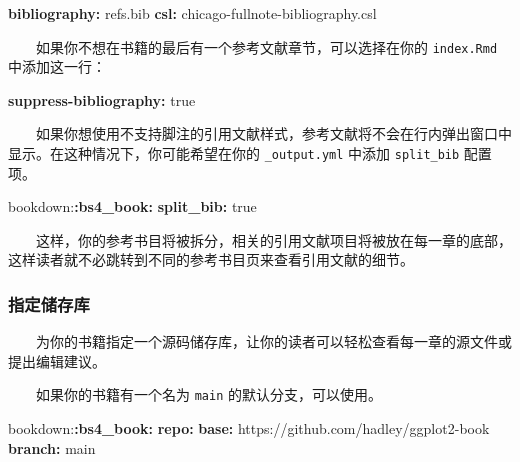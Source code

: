 \documentclass[
  12pt,
]{krantz}
\newenvironment{Shaded}{\begin{snugshade}}{\end{snugshade}}
\newcommand{\AttributeTok}[1]{\textcolor[rgb]{0.13,0.29,0.53}{#1}}
\newcommand{\CharTok}[1]{\textcolor[rgb]{0.31,0.60,0.02}{#1}}
\newcommand{\FunctionTok}[1]{\textcolor[rgb]{0.13,0.29,0.53}{\textbf{#1}}}
\newcommand{\KeywordTok}[1]{\textcolor[rgb]{0.13,0.29,0.53}{\textbf{#1}}}
\theoremstyle{definition}
\theoremstyle{definition}
\theoremstyle{definition}
\theoremstyle{definition}
\theoremstyle{remark}
\begin{document}
\begin{Shaded}
\begin{Highlighting}[]
\FunctionTok{bibliography}\KeywordTok{:}\AttributeTok{ refs.bib}
\FunctionTok{csl}\KeywordTok{:}\AttributeTok{ chicago{-}fullnote{-}bibliography.csl}
\end{Highlighting}
\end{Shaded}

  如果你不想在书籍的最后有一个参考文献章节，可以选择在你的 \texttt{index.Rmd} 中添加这一行：

\begin{Shaded}
\begin{Highlighting}[]
\FunctionTok{suppress{-}bibliography}\KeywordTok{:}\AttributeTok{ }\CharTok{true}
\end{Highlighting}
\end{Shaded}

  如果你想使用不支持脚注的引用文献样式，参考文献将不会在行内弹出窗口中显示。在这种情况下，你可能希望在你的 \texttt{\_output.yml} 中添加 \texttt{split\_bib} 配置项。

\begin{Shaded}
\begin{Highlighting}[]
\AttributeTok{bookdown:}\FunctionTok{:bs4\_book}\KeywordTok{:}
\AttributeTok{  }\FunctionTok{split\_bib}\KeywordTok{:}\AttributeTok{ }\CharTok{true}
\end{Highlighting}
\end{Shaded}

  这样，你的参考书目将被拆分，相关的引用文献项目将被放在每一章的底部，这样读者就不必跳转到不同的参考书目页来查看引用文献的细节。

\hypertarget{ux6307ux5b9aux50a8ux5b58ux5e93}{%
\subsubsection{指定储存库}\label{ux6307ux5b9aux50a8ux5b58ux5e93}}

  为你的书籍指定一个源码储存库，让你的读者可以轻松查看每一章的源文件或提出编辑建议。

  如果你的书籍有一个名为 \texttt{main} 的默认分支，可以使用。

\begin{Shaded}
\begin{Highlighting}[]
\AttributeTok{bookdown:}\FunctionTok{:bs4\_book}\KeywordTok{:}
\AttributeTok{  }\FunctionTok{repo}\KeywordTok{:}
\AttributeTok{    }\FunctionTok{base}\KeywordTok{:}\AttributeTok{ https://github.com/hadley/ggplot2{-}book}
\AttributeTok{    }\FunctionTok{branch}\KeywordTok{:}\AttributeTok{ main}
\end{Highlighting}
\end{Shaded}
\end{document}
